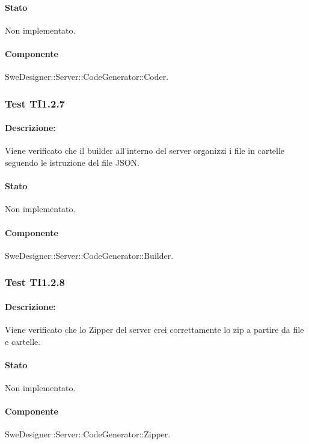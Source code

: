 \documentclass[../PianoDiQualifica.tex]{subfiles}
\begin{document}
	\paragraph{Stato} Non implementato.
	\paragraph{Componente} SweDesigner::Server::CodeGenerator::Coder.
	\subsubsection{Test TI1.2.7}
	\paragraph{Descrizione:} Viene verificato che il builder all'interno del server organizzi i file in cartelle seguendo le istruzione del file JSON.
	\paragraph{Stato} Non implementato.
	\paragraph{Componente} SweDesigner::Server::CodeGenerator::Builder.
	
	\subsubsection{Test TI1.2.8}
	\paragraph{Descrizione:} Viene verificato che lo Zipper del server crei correttamente lo zip a partire da file e cartelle.
	\paragraph{Stato} Non implementato.
	\paragraph{Componente} SweDesigner::Server::CodeGenerator::Zipper.
	
	
\end{document}

